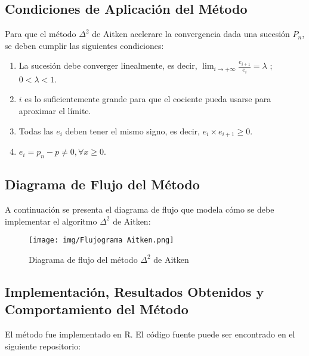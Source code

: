 \documentclass[a4paper,12pt]{article}
\begin{document}
\subsection{Condiciones de Aplicación del Método}

Para que el método $\Delta^2$ de Aitken acelerare la convergencia dada una sucesión $P_n$, se deben cumplir las siguientes condiciones: \par

\begin{enumerate}
    \item La sucesión debe converger linealmente, es decir, $\lim_{i \to{+} \infty}{\frac{e_{i+1}}{e_i}}= \lambda $ ;    $0<\lambda<1$.
    \item $i$ es lo suficientemente grande para que el cociente pueda usarse para aproximar el límite.
    \item  Todas las $e_i$ deben tener el mismo signo, es decir, $e_i \times e_{i+1} \ge 0$.
    \item $e_i = p_n - p \ne 0, \forall x \ge 0$.
    
\end{enumerate}

\newpage

\subsection{Diagrama de Flujo del Método}

A continuación se presenta el diagrama de flujo que modela cómo se debe implementar el algoritmo $\Delta^2$ de Aitken: \par 

\vspace{1em}
\begin{figure}[h!]
\centering
\texttt{[image: img/Flujograma Aitken.png]}
\caption{Diagrama de flujo del método $\Delta^2$ de Aitken}
\label{fig:flujograma_aitken}
\end{figure}

\newpage

\subsection{Implementación, Resultados Obtenidos y Comportamiento del Método}

El método fue implementado en R. El código fuente puede ser encontrado en el siguiente repositorio: \par
\end{document}
